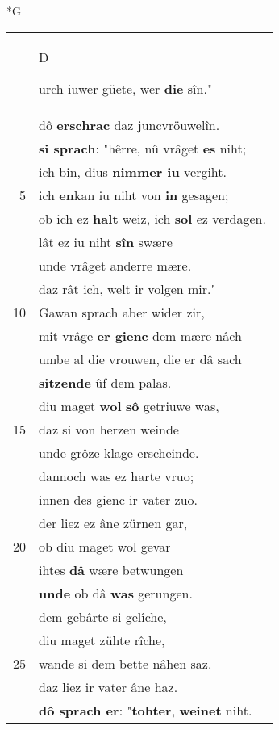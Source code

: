 \documentclass[8pt,a4paper,notitlepage]{article}
\begin{document}
\begin{table}[ht]
\begin{minipage}[t]{0.5\linewidth}
\small
\begin{center}*G
\end{center}
\begin{tabular}{rl}
 & \begin{large}D\end{large}urch iuwer güete, wer \textbf{die} sîn."\\ 
 & dô \textbf{erschrac} daz juncvröuwelîn.\\ 
 & \textbf{si sprach}: "hêrre, nû vrâget \textbf{es} niht;\\ 
 & ich bin, dius \textbf{nimmer iu} vergiht.\\ 
5 & ich \textbf{en}kan iu niht von \textbf{in} gesagen;\\ 
 & ob ich ez \textbf{halt} weiz, ich \textbf{sol} ez verdagen.\\ 
 & lât ez iu niht \textbf{sîn} swære\\ 
 & unde vrâget anderre mære.\\ 
 & daz rât ich, welt ir volgen mir."\\ 
10 & Gawan sprach aber wider zir,\\ 
 & mit vrâge \textbf{er gienc} dem mære nâch\\ 
 & umbe al die vrouwen, die er dâ sach\\ 
 & \textbf{sitzende} ûf dem palas.\\ 
 & diu maget \textbf{wol} \textbf{sô} getriuwe was,\\ 
15 & daz si von herzen weinde\\ 
 & unde grôze klage erscheinde.\\ 
 & dannoch was ez harte vruo;\\ 
 & innen des gienc ir vater zuo.\\ 
 & der liez ez âne zürnen gar,\\ 
20 & ob diu maget wol gevar\\ 
 & ihtes \textbf{dâ} wære betwungen\\ 
 & \textbf{unde} ob dâ \textbf{was} gerungen.\\ 
 & dem gebârte si gelîche,\\ 
 & diu maget zühte rîche,\\ 
25 & wande si dem bette nâhen saz.\\ 
 & daz liez ir vater âne haz.\\ 
 & \textbf{dô sprach er}: "\textbf{tohter}, \textbf{weinet} niht.\\ 

\end{tabular}
\end{minipage}
\end{table}
\end{document}
